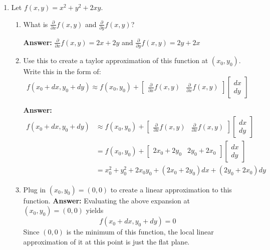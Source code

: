 \documentclass[12pt]{article}
\newcommand{\answer}[1]{{\color{blue_winged_teal}\textbf{Answer:} #1}}
\begin{document}
\begin{enumerate}
  \bigskip\bigskip
  \item Let $f(x, y) = x^2 + y^2 + 2xy$.
  \begin{enumerate}
    \item What is $\frac{\partial}{\partial x} f(x,y)$ and $\frac{\partial}{\partial y} f(x,y)$?

    \answer{
      $\frac{\partial}{\partial x} f(x,y) = 2x + 2y$ and
      $\frac{\partial}{\partial y} f(x,y) = 2y + 2x$
    }

    \item Use this to create a taylor approximation of this function at $(x_0, y_0)$. Write this in the form of:
    $$
      f(x_0 + dx, y_0 + dy) \approx f(x_0, y_0) + \begin{bmatrix}\frac{\partial}{\partial x} f(x,y) & \frac{\partial}{\partial x} f(x,y)\end{bmatrix} \begin{bmatrix}dx \\ dy\end{bmatrix}
    $$

    \answer{
      \begin{align*}
        f(x_0 + dx, y_0 + dy) &\approx f(x_0, y_0) + \begin{bmatrix}\frac{\partial}{\partial x} f(x,y) & \frac{\partial}{\partial x} f(x,y)\end{bmatrix} \begin{bmatrix}dx \\ dy\end{bmatrix} \\
        &= f(x_0, y_0) + \begin{bmatrix} 2x_0 + 2y_0 & 2y_0 + 2x_0 \end{bmatrix} \begin{bmatrix}dx \\ dy\end{bmatrix} \\
        &= x_0^2 + y_0^2 + 2x_0y_0 + (2x_0 + 2y_0) dx + (2y_0 + 2x_0) dy
      \end{align*}
    }

    \item Plug in $(x_0, y_0) = (0, 0)$ to create a linear approximation to this function.
    \answer{
      Evaluating the above expansion at $(x_0, y_0) = (0, 0)$ yields
      $$
        f(x_0 + dx, y_0 + dy) = 0
      $$
      Since $(0, 0)$ is the minimum of this function, the local linear approximation of it at this point is just the flat plane.
    }
  \end{enumerate}
\end{enumerate}
\end{document}

